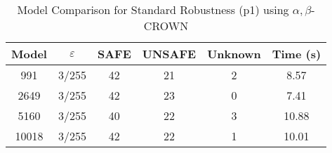 \begin{table}[htbp]
\centering
\caption{Model Comparison for Standard Robustness (p1) using $\alpha,\beta$-CROWN}
\label{tab:p1_abcrown_model_comparison}
\begin{tabular}{|c|c|c|c|c|c|}
\hline
Model & $\varepsilon$ & SAFE & UNSAFE & Unknown & Time (s) \\ \hline
991 & 3/255 & 42 & 21 & 2 & 8.57 \\ \hline
2649 & 3/255 & 42 & 23 & 0 & 7.41 \\ \hline
5160 & 3/255 & 40 & 22 & 3 & 10.88 \\ \hline
10018 & 3/255 & 42 & 22 & 1 & 10.01 \\ \hline
\end{tabular}
\end{table}
